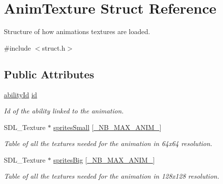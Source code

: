 \hypertarget{struct_anim_texture}{}\section{Anim\+Texture Struct Reference}
\label{struct_anim_texture}


Structure of how animations textures are loaded.  




{\ttfamily \#include $<$struct.\+h$>$}

\subsection*{Public Attributes}
\begin{DoxyCompactItemize}
\item 
\mbox{\label{struct_anim_texture_a67f19df248b2ff1ae24ae2323266ecd2}} 
\hyperlink{substruct_8h_a474a755e4cfa53534567029009496507}{ability\+Id} \hyperlink{struct_anim_texture_a67f19df248b2ff1ae24ae2323266ecd2}{id}
\begin{DoxyCompactList}\small\item\em Id of the ability linked to the animation. \end{DoxyCompactList}\item 
\mbox{\label{struct_anim_texture_a6f41b3cfde74d8e25b3f5667676e59d3}} 
S\+D\+L\+\_\+\+Texture $\ast$ \hyperlink{struct_anim_texture_a6f41b3cfde74d8e25b3f5667676e59d3}{sprites\+Small} \mbox{[}\hyperlink{common_8h_a064213c965bbbc0fc4482eb800c15969}{\+\_\+\+N\+B\+\_\+\+M\+A\+X\+\_\+\+A\+N\+I\+M\+\_\+}\mbox{]}
\begin{DoxyCompactList}\small\item\em Table of all the textures needed for the animation in 64x64 resolution. \end{DoxyCompactList}\item 
\mbox{\label{struct_anim_texture_a6dc8bf1106fea8390bdabbbe117f5fbe}} 
S\+D\+L\+\_\+\+Texture $\ast$ \hyperlink{struct_anim_texture_a6dc8bf1106fea8390bdabbbe117f5fbe}{sprites\+Big} \mbox{[}\hyperlink{common_8h_a064213c965bbbc0fc4482eb800c15969}{\+\_\+\+N\+B\+\_\+\+M\+A\+X\+\_\+\+A\+N\+I\+M\+\_\+}\mbox{]}
\begin{DoxyCompactList}\small\item\em Table of all the textures needed for the animation in 128x128 resolution. \end{DoxyCompactList}\item 

\end{DoxyCompactItemize}
